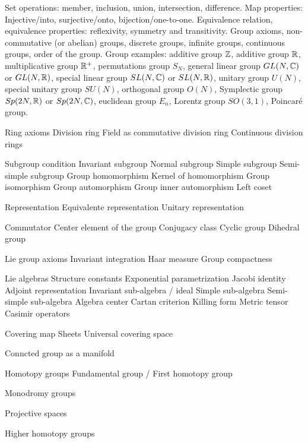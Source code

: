 

\usepackage[english]{babel}



\begin{multicols}{3}
  Set operations:
  member, inclusion, union, intersection, difference.
  Map properties:
  Injective/into, surjective/onto, bijection/one-to-one.
  Equivalence relation, equivalence properties:
  reflexivity, symmetry and transitivity.
  Group axioms, non-commutative (or abelian) groups, discrete groups,
  infinite groups, continuous groups, order of the group.
  Group examples:
  additive group $\mathbb{Z}$,
  additive group $\mathbb{R}$,
  multiplicative group $\mathbb{R}^+$,
  permutations group $S_N$,
  general linear group $GL(N, \mathbb{C})$ or $GL(N, \mathbb{R})$,
  special linear group $SL(N, \mathbb{C})$ or $SL(N, \mathbb{R})$,
  unitary group $U(N)$,
  special unitary group $SU(N)$,
  orthogonal group $O(N)$,
  Symplectic group $Sp(2N, \mathbb{R})$ or $Sp(2N, \mathbb{C})$,
  euclidean group $E_n$,
  Lorentz group $SO(3, 1)$,
  Poincar\'e group.

  Ring axioms
  Division ring
  Field as commutative division ring
  Continuous division rings

  Subgroup condition
  Invariant subgroup
  Normal subgroup
  Simple subgroup
  Semi-simple subgroup
  Group homomorphism
  Kernel of homomorphism
  Group isomorphism
  Group automorphism
  Group inner automorphism
  Left coset

  Representation
  Equivalente representation
  Unitary representation

  Commutator
  Center element of the group
  Conjugacy class
  Cyclic group
  Dihedral group

  Lie group axioms
  Invariant integration
  Haar measure
  Group compactness

  Lie algebras
  Structure constants
  Exponential parametrization
  Jacobi identity
  Adjoint representation
  Invariant sub-algebra / ideal
  Simple sub-algebra
  Semi-simple sub-algebra
  Algebra center
  Cartan criterion
  Killing form
  Metric tensor
  Casimir operators

  Covering map
  Sheets
  Universal covering space

  Conncted group as a manifold

  Homotopy groups
  Fundamental group / First homotopy group

  Monodromy groups

  Projective spaces

  Higher homotopy groups


\end{multicols}
